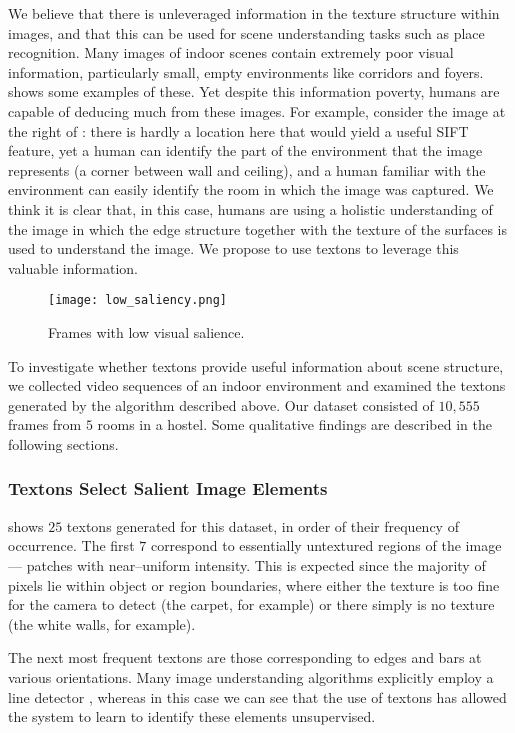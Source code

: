 We believe that there is unleveraged information in the texture
structure within images, and that this can be used for scene
understanding tasks such as place recognition. Many images of indoor
scenes contain extremely poor visual information, particularly small,
empty environments like corridors and
foyers.  shows some examples of these. Yet
despite this information poverty, humans are capable of deducing much
from these images. For example, consider the image at the right of
: there is hardly a location here that
would yield a useful SIFT feature, yet a human can identify the part
of the environment that the image represents (a corner between wall
and ceiling), and a human familiar with the environment can easily
identify the room in which the image was captured. We think it is
clear that, in this case, humans are using a holistic understanding of
the image in which the edge structure together with the texture of the
surfaces is used to understand the image. We propose to use textons to
leverage this valuable information.

\begin{figure}[htp]
\centering
\texttt{[image: low\_saliency.png]}
\caption{Frames with low visual salience.}
\label{fig:low-saliency-frames}
\end{figure}

To investigate whether textons provide useful information about scene
structure, we collected video sequences of an indoor environment and
examined the textons generated by the algorithm described above. Our
dataset consisted of $10,555$ frames from $5$ rooms in a hostel. Some
qualitative findings are described in the following sections.

\subsubsection{Textons Select Salient Image Elements}
 shows $25$ textons generated for this
dataset, in order of their frequency of occurrence. The first $7$
correspond to essentially untextured regions of the image --- \ie
patches with near--uniform intensity. This is expected since the
majority of pixels lie within object or region boundaries, where
either the texture is too fine for the camera to detect (the carpet,
for example) or there simply is no texture (the white walls, for
example).

The next most frequent textons are those corresponding to edges and
bars at various orientations. Many image understanding algorithms
explicitly employ a line detector \cite{Forsyth02}, whereas in this
case we can see that the use of textons has allowed the system to
learn to identify these elements unsupervised.

